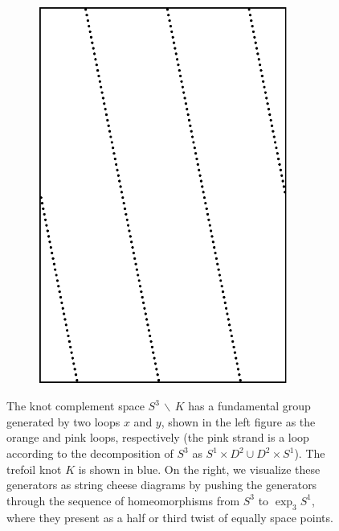 \documentclass[12pt,twoside]{reedthesis}
\theoremstyle{definition}
\newcommand{\wo}{\, \backslash \,}
\begin{document}
\begin{figure}[t]
\begin{subfigure}[c]{0.32\textwidth}
  \end{subfigure}
  \hfill
  \begin{subfigure}[c]{0.32\textwidth}
    \centering
    \includegraphics[width=0.9\textwidth]{figures/antipodal_subset_path_2.pdf}
  \end{subfigure}
  \caption{The knot complement space $S^3 \wo K$ has a fundamental group generated by two loops $x$ and $y$, shown in the left figure as the orange and pink loops, respectively (the pink strand is a loop according to the decomposition of $S^3$ as $S^1 \times D^2 \cup D^2 \times S^1$). The trefoil knot $K$ is shown in blue. On the right, we visualize these generators as string cheese diagrams by pushing the generators through the sequence of homeomorphisms from $S^3$ to $\exp_3 S^1$, where they present as a half or third twist of equally space points.}
  \label{fig:antipodal_point_paths}
\end{figure}
\end{document}
